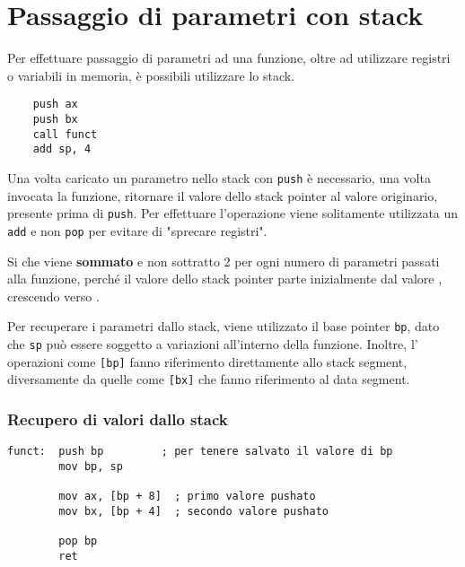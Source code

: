\documentclass[../template]{subfiles}
\begin{document}
\section{Passaggio di parametri con stack}
Per effettuare passaggio di parametri ad una funzione, oltre ad utilizzare registri o variabili in memoria, è possibili utilizzare lo stack.
\begin{lstlisting}
    push ax
    push bx
    call funct
    add sp, 4
\end{lstlisting}
Una volta caricato un parametro nello stack con \lstinline{push} è necessario, una volta invocata la funzione, ritornare il valore dello stack pointer al valore originario, presente prima di \lstinline{push}.
Per effettuare l'operazione viene solitamente utilizzata un \lstinline{add} e non \lstinline{pop} per evitare di "sprecare registri".

Si che viene \textbf{sommato} e non sottratto 2 per ogni numero di parametri passati alla funzione, perché il valore dello stack pointer parte inizialmente dal valore , crescendo verso .

Per recuperare i parametri dallo stack, viene utilizzato il base pointer \lstinline{bp}, dato che \lstinline{sp} può essere soggetto a variazioni all'interno della funzione.
Inoltre, l' operazioni come \lstinline{[bp]} fanno riferimento direttamente allo stack segment, diversamente da quelle come \lstinline{[bx]} che fanno riferimento al data segment.

\subsubsection{Recupero di valori dallo stack}
\begin{lstlisting}
funct:  push bp         ; per tenere salvato il valore di bp
        mov bp, sp

        mov ax, [bp + 8]  ; primo valore pushato
        mov bx, [bp + 4]  ; secondo valore pushato

        pop bp
        ret
\end{lstlisting}
\end{document}

